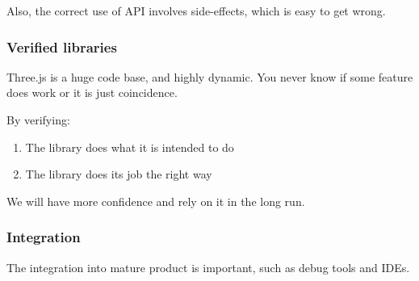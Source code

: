 \documentclass[]{article}
\begin{document}
Also, the correct use of API involves side-effects, which is easy to get
wrong.

\subsubsection{Verified libraries}\label{verified-libraries}

Three.js is a huge code base, and highly dynamic. You never know if some
feature does work or it is just coincidence.

By verifying:

\begin{enumerate}
\def\labelenumi{\arabic{enumi}.}
\itemsep1pt\parskip0pt
\item
  The library does what it is intended to do
\item
  The library does its job the right way
\end{enumerate}

We will have more confidence and rely on it in the long run.

\subsubsection{Integration}\label{integration}

The integration into mature product is important, such as debug tools
and IDEs.



\end{document}
